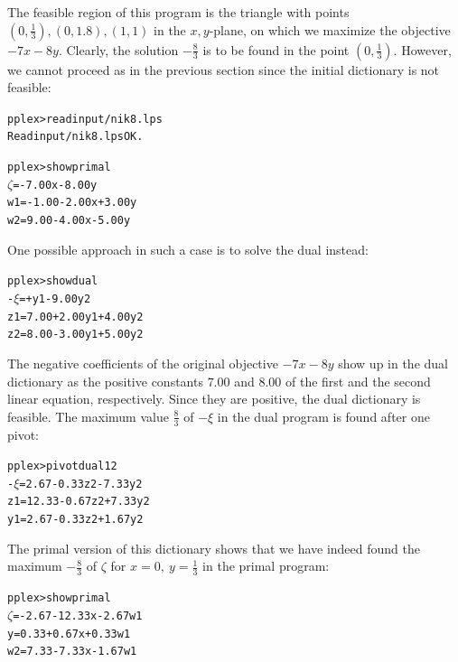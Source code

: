 \documentclass[ukenglish]{nik}
\begin{document}
The feasible region of this program is the
triangle with points $(0,\frac{1}{3}),(0,1.8),(1,1)$
in the $x,y$-plane, on which we maximize the objective $-7x-8y$.
Clearly, the solution $-\frac{8}{3}$ is to be found in the point $(0,\frac{1}{3})$.
However, we cannot proceed as in the previous section since the
initial dictionary is not feasible:
\begin{alltt}
pplex> read input/nik8.lps
Read input/nik8.lps OK.

pplex> show primal
 \(\zeta\) =        - 7.00x - 8.00y
w1 = - 1.00 - 2.00x + 3.00y
w2 =   9.00 - 4.00x - 5.00y
\end{alltt}
One possible approach in such a case is to solve the dual instead:
\begin{alltt}
pplex> show dual
-\(\xi\) =      +     y1 - 9.00y2
z1 = 7.00 + 2.00y1 + 4.00y2
z2 = 8.00 - 3.00y1 + 5.00y2
\end{alltt}
The negative coefficients of the original objective $-7x-8y$ show up in the dual
dictionary as the positive constants $7.00$ and $8.00$ of the first and the second 
linear equation, respectively. Since they are positive, the dual dictionary is feasible.
The maximum value $\frac{8}{3}$ of \(-\xi\) in the dual program is found after one pivot:
\begin{alltt}
pplex> pivot dual 1 2
-\(\xi\) =  2.67 - 0.33z2 - 7.33y2
z1 = 12.33 - 0.67z2 + 7.33y2
y1 =  2.67 - 0.33z2 + 1.67y2
\end{alltt}
The primal version of this dictionary shows that we have indeed found the
maximum $-\frac{8}{3}$ of $\zeta$ for $x=0,~y=\frac{1}{3}$ in the primal program:
\begin{alltt}
pplex> show primal
 \(\zeta\) = - 2.67 - 12.33x - 2.67w1
 y =   0.33 +  0.67x + 0.33w1
w2 =   7.33 -  7.33x - 1.67w1
\end{alltt}
\end{document}
